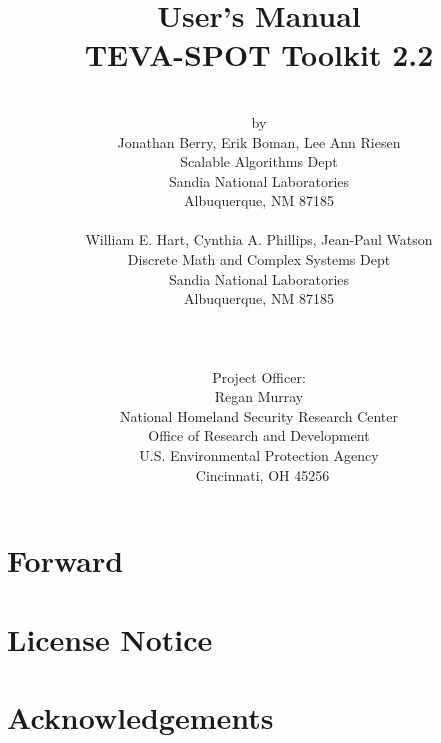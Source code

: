\documentclass[pdf,report]{EPAmanual}
\title{\sc User's Manual\\TEVA-SPOT Toolkit 2.2}
\author{\\by\\
Jonathan Berry, Erik Boman, Lee Ann Riesen\\
Scalable Algorithms Dept\\
Sandia National Laboratories\\
Albuquerque, NM 87185\\
\mbox{}\\
William E. Hart, Cynthia A. Phillips, Jean-Paul Watson\\
Discrete Math and Complex Systems Dept\\
Sandia National Laboratories\\
Albuquerque, NM 87185\\
    \\\\\\
    Project Officer:\\
    \sc Regan Murray\\
    \sc National Homeland Security Research Center\\
    \sc Office of Research and Development\\
    \sc U.S. Environmental Protection Agency\\\
    \sc Cincinnati, OH 45256
  }
\date{}
\begin{document}
  \maketitle

  \clearpage
  
  
  \clearpage
  \chapter*{Forward}
  

  \clearpage
  \chapter*{License Notice}
  

  \clearpage
  \chapter*{Acknowledgements}
  

  \cleardoublepage
  \tableofcontents

  \SANDmain



\newpage




\newpage

\appendix





  
\end{document}
